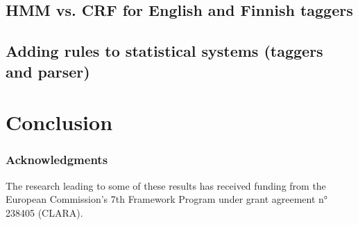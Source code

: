 \documentclass{llncs}
\begin{document}
\subsection{HMM vs. CRF for English and Finnish taggers}

\subsection{Adding rules to statistical systems (taggers and parser)}

\section{Conclusion}\label{hfst:conclusion}

\subsubsection*{Acknowledgments}
The research leading to some of these results has received funding from the
European Commission's 7th Framework Program under grant agreement n° 238405 (CLARA).




\end{document}
